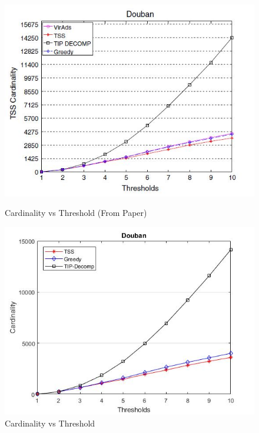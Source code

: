 \begin{figure}[h!]
\begin{minipage}[t]{0.50\textwidth}
\includegraphics[width=\linewidth,keepaspectratio=true]{images/doubanpaper.jpg}
\caption{Cardinality vs Threshold (From Paper)}

\end{minipage}
\begin{minipage}[t]{0.50\textwidth}
\includegraphics[width=\linewidth,keepaspectratio=true]{images/doubanresult.jpg}
\caption{Cardinality vs Threshold}
\end{minipage}
\end{figure}

